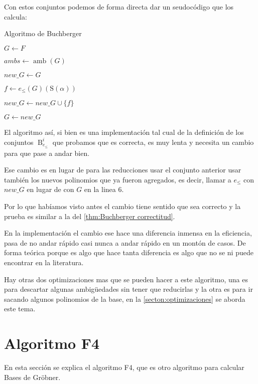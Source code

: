 \documentclass{report}
\theoremstyle{customstyle}
\theoremstyle{factstyle}
\DeclareMathOperator{\amb}{amb}
\renewcommand{\S}{\text{S}}
\DeclareMathOperator{\B}{B}
\begin{document}
Con estos conjuntos podemos de forma directa dar un seudocódigo que los calcula:

\begin{algorithm}[H] %
  \caption{Algoritmo de Buchberger}\label{alg:Buchberger}
  $G ← F$

  \Loop{} {
    $ambs ← \amb(G)$

    $new\_G ← G$

     {
      $f ← e_≤(G)(\S(α))$

       {
        $new\_G ← new\_G ∪ \{f\}$
      }
    }

     {
      \Break
    }

    $G ← new\_G$
  }
\end{algorithm}

El algoritmo así, si bien es una implementación tal cual de la definición de los conjuntos $\B_{e_≤}^i$ que probamos que es correcta, es muy lenta y necesita un cambio para que pase a andar bien.

Ese cambio es en lugar de para las reducciones usar el conjunto anterior usar también los nuevos polinomios que ya fueron agregados, es decir, llamar a $e_≤$ con $new\_G$ en lugar de con $G$ en la linea 6. %

Por lo que habíamos visto antes el cambio tiene sentido que sea correcto y la prueba es similar a la del \cref{thm:Buchberger correctitud}.

En la implementación el cambio ese hace una diferencia inmensa en la eficiencia, pasa de no andar rápido casi nunca a andar rápido en un montón de casos. De forma teórica porque es algo que hace tanta diferencia es algo que no se ni puede encontrar en la literatura.

Hay otras dos optimizaciones mas que se pueden hacer a este algoritmo, una es para descartar algunas ambigüedades sin tener que reducirlas y la otra es para ir sacando algunos polinomios de la base, en la \cref{secton:optimizaciones} se aborda este tema.

\section{Algoritmo F4}

En esta sección se explica el algoritmo F4, que es otro algoritmo para calcular Bases de Gröbner.
\end{document}
